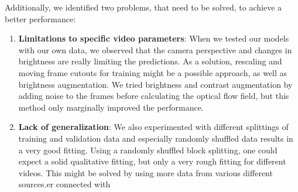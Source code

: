 \documentclass[conference]{IEEEtran}
\begin{document}
Additionally, we identified two problems, that need to be solved, to achieve a better performance:
\begin{enumerate}[label=(\roman*)]
	\item \textbf{Limitations to specific video parameters}: When we tested our models with our own
	data, we observed that the camera perspective and changes in brightness are really limiting
	the predictions. As a solution, rescaling and moving frame cutouts for training might be a 
	possible approach, as well as brightness augmentation. We tried brightness and contrast 
	augmentation by adding noise to the frames before calculating the optical flow field,
	but this method only marginally improved the performance.
	\item \textbf{Lack of generalization}: We also experimented with different splittings of
	training and validation data and especially randomly shuffled data results in a very good fitting.
	Using a randomly shuffled 	block splitting, one could expect a solid qualitative fitting, but 
	only a very rough fitting for different videos. This might be solved by using more data from various 
	different sources.er connected with
\end{enumerate}
\printbibliography
\end{document}
